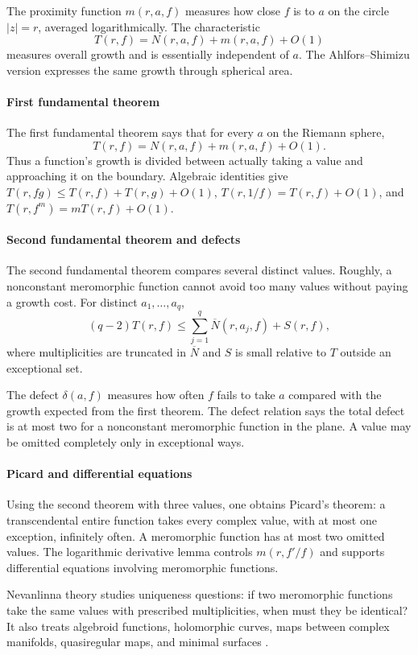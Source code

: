 The proximity function $m(r,a,f)$ measures how close $f$ is to $a$ on the circle $|z|=r$, averaged logarithmically. The characteristic
\[
T(r,f)=N(r,a,f)+m(r,a,f)+O(1)
\]
measures overall growth and is essentially independent of $a$. The Ahlfors--Shimizu version expresses the same growth through spherical area.

\paragraph{First fundamental theorem}
The first fundamental theorem says that for every $a$ on the Riemann sphere,
\[
T(r,f)=N(r,a,f)+m(r,a,f)+O(1).
\]
Thus a function's growth is divided between actually taking a value and approaching it on the boundary. Algebraic identities give
$T(r,fg)\leq T(r,f)+T(r,g)+O(1)$,
$T(r,1/f)=T(r,f)+O(1)$, and
$T(r,f^m)=mT(r,f)+O(1)$.

\paragraph{Second fundamental theorem and defects}
The second fundamental theorem compares several distinct values. Roughly, a nonconstant meromorphic function cannot avoid too many values without paying a growth cost. For distinct $a_1,\ldots,a_q$,
\[
(q-2)T(r,f)\leq\sum_{j=1}^q\overline N(r,a_j,f)+S(r,f),
\]
where multiplicities are truncated in $\overline N$ and $S$ is small relative to $T$ outside an exceptional set.

The defect $\delta(a,f)$ measures how often $f$ fails to take $a$ compared with the growth expected from the first theorem. The defect relation says the total defect is at most two for a nonconstant meromorphic function in the plane. A value may be omitted completely only in exceptional ways.

\paragraph{Picard and differential equations}
Using the second theorem with three values, one obtains Picard's theorem: a transcendental entire function takes every complex value, with at most one exception, infinitely often. A meromorphic function has at most two omitted values. The logarithmic derivative lemma controls $m(r,f'/f)$ and supports differential equations involving meromorphic functions.

Nevanlinna theory studies uniqueness questions: if two meromorphic functions take the same values with prescribed multiplicities, when must they be identical? It also treats algebroid functions, holomorphic curves, maps between complex manifolds, quasiregular maps, and minimal surfaces \cite{nevanlinna_theory_ref2}.

